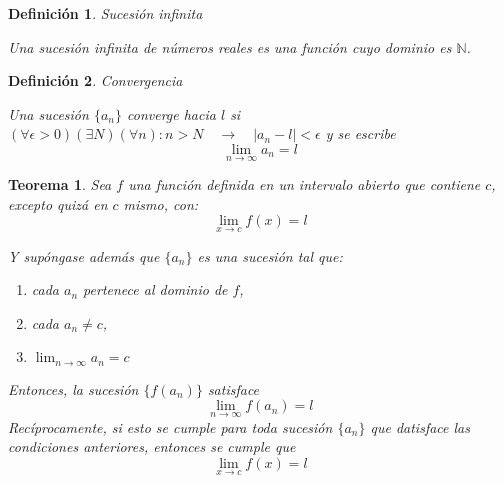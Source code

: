 \documentclass[12pt,a4paper]{extarticle}
\newtheorem{theorem}{Teorema}[section]
\newtheorem{mydef}{Definici\'on}[section]
\begin{document}
\begin{mydef}{Sucesi\'on infinita}

Una sucesi\'on infinita de n\'umeros reales es una funci\'on cuyo
dominio es \(\mathbb{N}\).
\end{mydef}
\begin{mydef}{Convergencia}

Una sucesi\'on \( \{ a_n \} \) \emph{converge hacia \( l \)} si  \(
(\forall \epsilon > 0) (\exists N) (\forall n)  :   n > N
\quad \to \quad | a_n - l | < \epsilon \) y se escribe
\[ \lim_{n \to \infty} a_n = l \]
\end{mydef}
\begin{theorem}
Sea \( f \) una funci\'on definida en un intervalo abierto que contiene
\( c \), excepto quiz\'a en \( c \) mismo, con:
\[ \lim_{x \to c} f(x) = l \]

Y sup\'ongase adem\'as que \( \{ a_n \} \) es una sucesi\'on tal que:
\begin{enumerate}
\item cada \( a_n \) pertenece al dominio de \( f \),
\item cada \( a_n \neq c \),
\item \(\lim_{n \to \infty} a_n = c\)
\end{enumerate}

Entonces, la sucesi\'on \( \{ f(a_n) \} \) satisface
\[ \lim_{n \to \infty} f(a_n) = l\]
Rec\'iprocamente, si esto se cumple para toda sucesi\'on \( \{ a_n \}
\) que datisface las condiciones anteriores, entonces se cumple que
\[ \lim_{x \to c} f(x) = l \]
\end{theorem}
\end{document}
